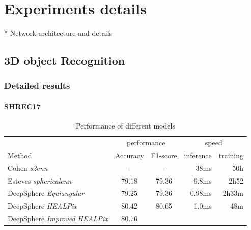 \documentclass{article} %
\begin{document}
\section{Experiments details}
* Network architecture and details
\subsection{3D object Recognition}
\subsubsection*{Detailed results}
\paragraph*{SHREC17}
\begin{table}[!ht]
    \centering
    \begin{tabular}{l|c c r r}
        \multicolumn{1}{l}{} & \multicolumn{2}{c}{performance} & \multicolumn{2}{c}{speed}\\
        \cmidrule(lr){2-3} \cmidrule(lr){4-5}
        \multicolumn{1}{l}{Method} & Accuracy & F1-score & inference & training \\ \hline
        Cohen \emph{s2cnn} & - & - & 38ms & 50h\\
        Esteves \emph{sphericalcnn} & 79.18 & 79.36 & 9.8ms & 2h52\\ \hline
        DeepSphere \emph{Equiangular} & 79.25 & 79.36 & 0.98ms & 2h33m \\
        DeepSphere \emph{HEALPix} & 80.42 & 80.65 & 1.0ms & 48m\\
        DeepSphere \emph{Improved HEALPix} & 80.76 & & & 
    \end{tabular}
    \caption{Performance of different models}
    \label{tab:SHREC17_class}
\end{table}
\end{document}

